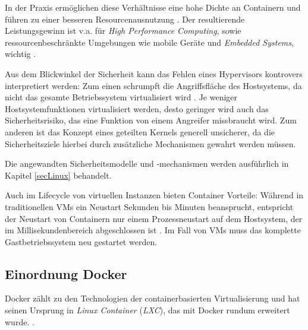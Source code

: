\documentclass[../main.tex]{subfiles}
\begin{document}
			In der Praxis ermöglichen diese Verhältnisse eine hohe Dichte an Containern und führen zu einer besseren Resourcenausnutzung \cite[S.7f.]{dockerBook}. Der resultierende Leistungsgewinn ist v.a. für \emph{High Performance Computing}, sowie ressourcenbeschränkte Umgebungen wie mobile Geräte und \emph{Embedded Systems}, wichtig \cite[S.1]{dockerSec2}.

      Aus dem Blickwinkel der Sicherheit kann das Fehlen eines Hypervisors kontrovers interpretiert werden: Zum einen schrumpft die Angriffsfläche des Hostsystems, da nicht das gesamte Betriebssystem virtualisiert wird \cite[S.6]{dockerBook}. Je weniger Hostsystemfunktionen virtualisiert werden, desto geringer wird auch das Sicherheitsrisiko, das eine Funktion von einem Angreifer missbraucht wird. Zum anderen ist das Konzept eines geteilten Kernels generell unsicherer, da die Sicherheitsziele hierbei durch zusätzliche Mechanismen gewahrt werden müssen.

			Die angewandten Sicherheitsmodelle und -mechanismen werden ausführlich in Kapitel \ref{secLinux} behandelt.



			Auch im Lifecycle von virtuellen Instanzen bieten Container Vorteile: Während in traditionellen \acrshort{VM}s ein Neustart Sekunden bis Minuten beansprucht, entspricht der Neustart von Containern nur einem Prozessneustart auf dem Hostsystem, der im Millisekundenbereich abgeschlossen ist \cite[S.2]{dockerLXCKub}.
			Im Fall von VMs muss das komplette Gastbetriebssystem neu gestartet werden.

	  \subsection{Einordnung Docker}
      Docker zählt zu den Technologien der containerbasierten Virtualisierung und hat seinen Ursprung in \emph{Linux Container} (\emph{LXC}), das mit Docker rundum erweitert wurde. \cite[S.7]{dockerBook}\cite[S.1]{containerVirtPerformance}\cite[S.2]{dockerLXCKub}.
\end{document}
